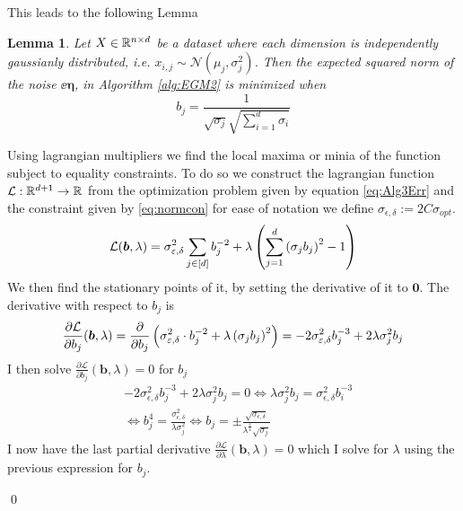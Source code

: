 \documentclass[a4paper,12pt]{article}
\renewenvironment{proof}{{\textit{Proof} \\}}{\qed}
\newtheorem{lemma}{Lemma}[section]
\begin{document}
\noindent This leads to the following Lemma

\begin{lemma}
\label{lem:Optb}
Let $X \in \mathbb{R}^{n \times d}$ be a dataset where each dimension is independently gaussianly distributed, i.e.
$x_{i,j} \sim \mathcal{N}(\mu_j, \sigma_j^2)$.
Then the expected squared norm of the noise $\ee{\bm{\eta}}$, 
in Algorithm \ref{alg:EGM2} is minimized when
\[
    b_j = \frac{1}{\sqrt{\sigma_j} \sqrt{\sum_{i=1}^d \sigma_i}}
\]
\end{lemma}
\begin{proof}
Using lagrangian multipliers we find the local maxima or 
minia of the function subject to equality constraints.
To do so we construct the lagrangian function $\mathcal{L}: \mathbb{R}^{d+1} \rightarrow \mathbb{R}$ from the optimization problem given by
equation \eqref{eq:Alg3Err} and the constraint given by \eqref{eq:normcon} for ease of notation we define 
$\sigma_{\epsilon, \delta} := 2C\sigma_{opt}$.
\[
    \mathcal{L}(\bm{b},\lambda) = \sigma_{\varepsilon,\delta}^2\sum_{j \in [d]} b_j^{-2}
    + \lambda \left ( \sum_{j=1}^d \left (\sigma_j b_j\right)^2 - 1\right)
\]
We then find the stationary points of it,
by setting the derivative of it to $\bm{0}$.
The derivative with respect to $b_j$ is 
\[
    \frac{\partial \mathcal{L}}{\partial b_j} (\bm{b}, \lambda)= 
    \frac{\partial}{\partial b_j} \left (\sigma_{\varepsilon,\delta}^2 \cdot b_j^{-2}
    + \lambda \left (\sigma_j b_j\right)^2\right) =
    -2 \sigma_{\varepsilon,\delta}^2 b_j^{-3} + 2 \lambda \sigma_j^2b_j
\]
I then solve $\frac{\partial \mathcal{L}}{\partial b_j}(\bm{b},\lambda) = 0$ for $b_j$
\begin{align}
    &-2\sigma_{\epsilon,\delta}^2 b_j^{-3} + 2 \lambda \sigma_j^2b_j = 0 \iff
    \lambda \sigma_j^2b_j = \sigma_{\epsilon,\delta}^2 b_i^{-3}  \\
\label{eq:solvbi}
    &\iff b_j^4 = \frac{\sigma_{\epsilon,\delta}^2}{\lambda \sigma_j^2} \iff 
    b_j = \pm \frac{\sqrt{\sigma_{\epsilon,\delta}}}{\lambda^{\frac{1}{4}} \sqrt{\sigma_j}} 
\end{align}
I now have the last partial derivative 
$\frac{\partial \mathcal{L}}{\partial \lambda}(\bm{b},\lambda) = 0$ which I solve for
$\lambda$ using the previous expression for $b_j$.


\end{proof}
\end{document}
